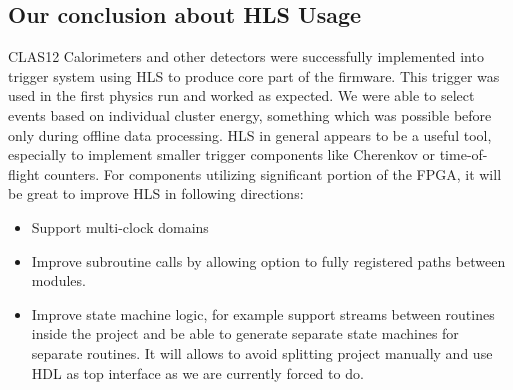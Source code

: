\subsection{Our conclusion about HLS Usage}

CLAS12 Calorimeters and other detectors were successfully implemented into trigger system using HLS to produce core part of the firmware. This trigger was used in the first physics run and worked as expected. We were able to select events based on individual cluster energy, something which was possible before only during offline data processing.
HLS in general appears to be a useful tool, especially to implement smaller trigger components like Cherenkov or time-of-flight counters. For components utilizing significant portion of the FPGA, it will be great to improve HLS in following directions:

\begin{itemize}
	\item Support multi-clock domains
	\item Improve subroutine calls by allowing option to fully registered paths between modules. 
	\item Improve state machine logic, for example support streams between routines inside the project and be able to generate separate state machines for separate routines. It will allows to avoid splitting project manually and use HDL as top interface as we are currently forced to do.
\end{itemize}
